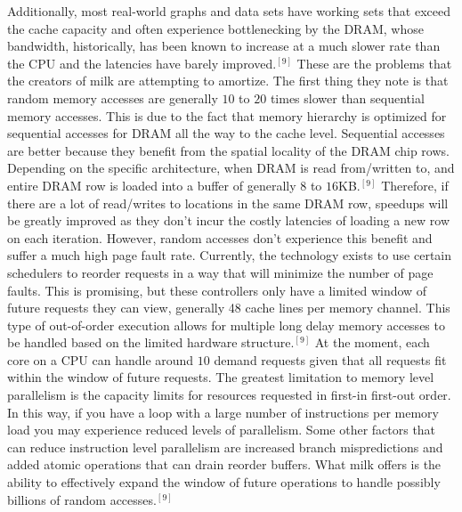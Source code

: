 \documentclass[conference]{IEEEtran}
\begin{document}
Additionally, most real-world graphs and data sets have working sets that exceed the cache capacity and often experience bottlenecking by the DRAM, whose bandwidth, historically, has been known to increase at a much slower rate than the CPU and the latencies have barely improved.$^{[9]}$  These are the problems that the creators of milk are attempting to amortize.  The first thing they note is that random memory accesses are generally $10$ to $20$ times slower than sequential memory accesses.  This is due to the fact that memory hierarchy is optimized for sequential accesses for DRAM all the way to the cache level.  Sequential accesses are better because they benefit from the spatial locality of the DRAM chip rows.  Depending on the specific architecture, when DRAM is read from/written to, and entire DRAM row is loaded into a buffer of generally $8$ to $16$KB.$^{[9]}$  Therefore, if there are a lot of read/writes to locations in the same DRAM row, speedups will be greatly improved as they don't incur the costly latencies of loading a new row on each iteration.  However, random accesses don't experience this benefit and suffer a much high page fault rate.  Currently, the technology exists to use certain schedulers to reorder requests in a way that will minimize the number of page faults.  This is promising, but these controllers only have a limited window of future requests they can view, generally 48 cache lines per memory channel.  This type of out-of-order execution allows for multiple long delay memory accesses to be handled based on the limited hardware structure.$^{[9]}$  At the moment, each core on a CPU can handle around $10$ demand requests given that all requests fit within the window of future requests.  The greatest limitation to memory level parallelism is the capacity limits for resources requested in first-in first-out order.  In this way, if you have a loop with a large number of instructions per memory load you may experience reduced levels of parallelism.  Some other factors that can reduce instruction level parallelism are increased branch mispredictions and added atomic operations that can drain reorder buffers.  What milk offers is the ability to effectively expand the window of future operations to handle possibly billions of random accesses.$^{[9]}$  
\end{document}

